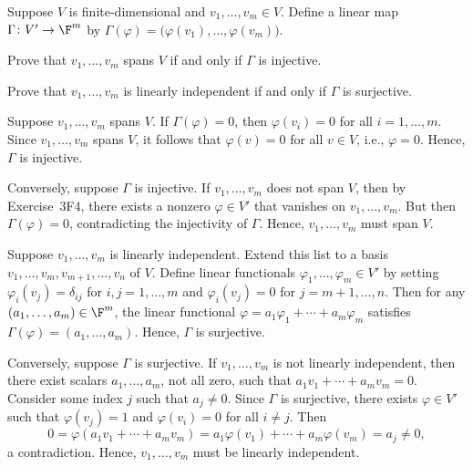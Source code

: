 \begin{exc}
\begin{exercise}
Suppose $V$ is finite-dimensional and $v_1,\dots,v_m\in V$. Define a linear map
$\Gamma\colon V'\to\F^m$ by
$\Gamma(\varphi)=\bigl(\varphi(v_1),\dots,\varphi(v_m)\bigr)$.
\begin{parts}
\item Prove that $v_1,\dots,v_m$ spans $V$ if and only if $\Gamma$ is injective.
\item Prove that $v_1,\dots,v_m$ is linearly independent if and only if
  $\Gamma$ is surjective.
\end{parts}
\end{exercise}
\begin{solution}\leavevmode
\begin{parts}
\item Suppose $v_1,\dots,v_m$ spans $V$. If $\Gamma(\varphi)=0$, then
  $\varphi(v_i)=0$ for all $i=1,\dots,m$. Since $v_1,\dots,v_m$ spans $V$, it
  follows that $\varphi(v)=0$ for all $v\in V$, i.e., $\varphi=0$. Hence,
  $\Gamma$ is injective.

  Conversely, suppose $\Gamma$ is injective. If $v_1,\dots,v_m$ does not span
  $V$, then by Exercise~3F4, there exists a nonzero $\varphi\in V'$ that
  vanishes on $v_1,\dots,v_m$. But then $\Gamma(\varphi)=0$, contradicting the
  injectivity of $\Gamma$. Hence, $v_1,\dots,v_m$ must span $V$.
\item Suppose $v_1,\dots,v_m$ is linearly independent. Extend this list to a
  basis $v_1,\dots,v_m,\allowbreak v_{m+1},\dots,v_n$ of $V$. Define linear functionals
  $\varphi_1,\dots,\varphi_m\in V'$ by setting $\varphi_i(v_j)=\delta_{ij}$ for
  $i,j=1,\dots,m$ and $\varphi_i(v_j)=0$ for $j=m+1,\dots,n$. Then for any
  $(a_1,\dots,a_m)\in\F^m$, the linear functional
  $\varphi=a_1\varphi_1+\cdots+a_m\varphi_m$ satisfies
  $\Gamma(\varphi)=(a_1,\dots,a_m)$. Hence, $\Gamma$ is surjective.

  Conversely, suppose $\Gamma$ is surjective. If $v_1,\dots,v_m$ is not
  linearly independent, then there exist scalars $a_1,\dots,a_m$, not all zero,
  such that $a_1v_1+\cdots+a_mv_m=0$. Consider some index $j$ such that
  $a_j\ne0$. Since $\Gamma$ is surjective, there exists $\varphi\in V'$ such
  that $\varphi(v_j)=1$ and $\varphi(v_i)=0$ for all $i\ne j$. Then
  \[ 0 = \varphi(a_1v_1+\cdots+a_mv_m)
       = a_1\varphi(v_1)+\cdots+a_m\varphi(v_m) = a_j\ne0, \]
  a contradiction. Hence, $v_1,\dots,v_m$ must be linearly independent.
  \qedhere
\end{parts}
\end{solution}


\end{exc}
